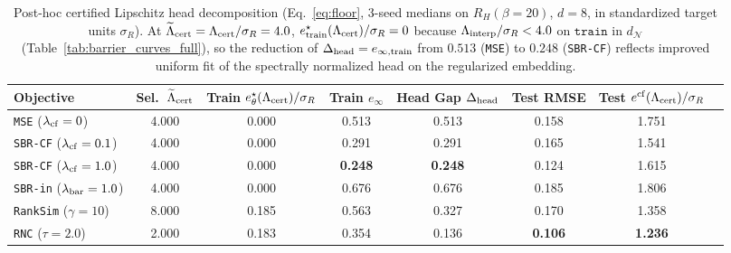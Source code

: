 \documentclass[preprint,11pt,a4paper]{elsarticle}
\newcommand{\ecf}{e^{\rm cf}}
\begin{document}
\begin{table}[ht!]
\centering
\caption{Post-hoc certified Lipschitz head decomposition (Eq.~\eqref{eq:floor}, 3-seed medians on $R_H(\beta=20)$, $d=8$, in standardized target units $\sigma_R$). At $\widetilde\Lambda_{\rm cert}=\Lambda_{\rm cert}/\sigma_R=4.0$, $e^\star_{\rm train}(\Lambda_{\rm cert})/\sigma_R=0$ because $\Lambda_{\rm interp}/\sigma_R < 4.0$ on $\texttt{train}$ in $d_{\mathcal N}$ (Table~\ref{tab:barrier_curves_full}), so the reduction of $\Delta_{\rm head}=e_{\infty,{\rm train}}$ from $0.513$ (\texttt{MSE}) to $0.248$ (\texttt{SBR-CF}) reflects improved uniform fit of the spectrally normalized head on the regularized embedding.}
\label{tab:cert_floor}
\footnotesize
\setlength{\tabcolsep}{3.2pt}
\begin{tabular}{lccccccc}
\toprule
Objective & Sel.\ $\widetilde\Lambda_{\rm cert}$ & Train $e^\star_\theta(\Lambda_{\rm cert})/\sigma_R$ & Train $e_\infty$ & Head Gap $\Delta_{\rm head}$ & Test RMSE & Test $\ecf(\Lambda_{\rm cert})/\sigma_R$ \\
\midrule
\texttt{MSE} ($\lambda_{\rm cf}=0$) & 4.000 & 0.000 & 0.513 & 0.513 & 0.158 & 1.751 \\
\texttt{SBR-CF} ($\lambda_{\rm cf}=0.1$) & 4.000 & 0.000 & 0.291 & 0.291 & 0.165 & 1.541 \\
\texttt{SBR-CF} ($\lambda_{\rm cf}=1.0$) & 4.000 & 0.000 & \textbf{0.248} & \textbf{0.248} & 0.124 & 1.615 \\
\texttt{SBR-in} ($\lambda_{\rm bar}=1.0$) & 4.000 & 0.000 & 0.676 & 0.676 & 0.185 & 1.806 \\
\texttt{RankSim} ($\gamma=10$) & 8.000 & 0.185 & 0.563 & 0.327 & 0.170 & 1.358 \\
\texttt{RNC} ($\tau=2.0$) & 2.000 & 0.183 & 0.354 & 0.136 & \textbf{0.106} & \textbf{1.236} \\
\bottomrule
\end{tabular}
\end{table}
\end{document}
